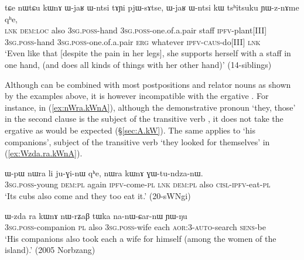     \begin{exe}
\ex \label{ex:nWtCu.kWnA2}
\gll    tɕe nɯtɕu kɯnɤ ɯ-jaʁ ɯ-ntsi tɤɲi pjɯ-sɤtse, ɯ-jaʁ ɯ-ntsi kɯ tsʰitsuku ɲɯ-z-nɤme qʰe, \\
\textsc{lnk} \textsc{dem}:\textsc{loc} also \textsc{3sg}.\textsc{poss}-hand \textsc{3sg}.\textsc{poss}-one.of.a.pair staff \textsc{ipfv}-plant[III]  \textsc{3sg}.\textsc{poss}-hand \textsc{3sg}.\textsc{poss}-one.of.a.pair \textsc{erg} whatever \textsc{ipfv}-\textsc{caus}-do[III] \textsc{lnk}  \\
\glt `Even like that [despite the pain in her legs], she supports herself with a staff in one hand, (and does all kinds of things with her other hand)' (14-siblings) 
\end{exe}

Although  can be combined with most postpositions and relator nouns as shown by the examples above, it is however incompatible with the ergative . For instance, in  (\ref{ex:nWra.kWnA}), although the demonstrative pronoun  `they, those' in the second clause is the subject of the transitive verb , it does not take the ergative  as would be expected (§\ref{sec:A.kW}). The same applies to  `his companions', subject of the transitive verb  `they looked for themselves' in (\ref{ex:Wzda.ra.kWnA}).


  \begin{exe}
\ex \label{ex:nWra.kWnA}
\gll ɯ-pɯ nɯra li ju-ɣi-nɯ qʰe, nɯra kɯnɤ ɣɯ-tu-ndza-nɯ. \\
\textsc{3sg}.\textsc{poss}-young \textsc{dem}:\textsc{pl} again \textsc{ipfv}-come-\textsc{pl} \textsc{lnk} \textsc{dem}:\textsc{pl} also \textsc{cisl}-\textsc{ipfv}-eat-\textsc{pl} \\
\glt `Its cubs also come and they too eat it.' (20-sWNgi) 
\end{exe}
  
\begin{exe}
\ex \label{ex:Wzda.ra.kWnA}
\gll   ɯ-zda ra kɯnɤ nɯ-rʑaβ tɯka na-nɯ-ɕar-nɯ ɲɯ-ŋu \\
\textsc{3sg}.\textsc{poss}-companion \textsc{pl} also \textsc{3sg}.\textsc{poss}-wife each \textsc{aor}:3\flobv{}-\textsc{auto}-search \textsc{sens}-be \\
\glt `His companions also took each a wife for himself (among the women of the island).' (2005 Norbzang)
    \end{exe}
    
